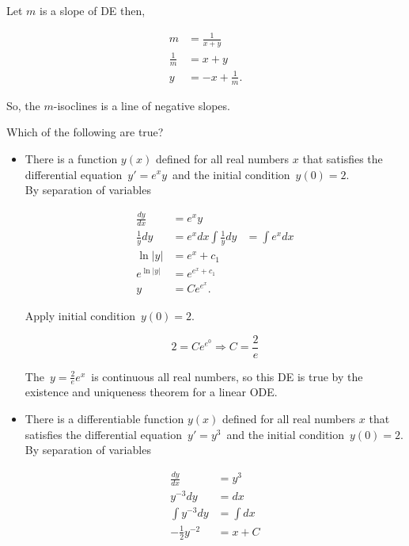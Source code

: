 Let $m$ is a slope of DE then,

\begin{align*}
  m &= \frac{1}{x + y} \\
  \frac{1}{m} &= x + y \\
  y &= -x + \frac{1}{m}. 
\end{align*}

So, the $m$-isoclines is a line of negative slopes.

\begin{problem}
  Which of the following are true? 
\end{problem}

\begin{itemize}
\item There is a function $y(x)$ defined for all real numbers $x$ that
  satisfies the differential equation $\, y' = e^xy \,$
  and the initial condition $\, y(0)=2$. \\

  By separation of variables

  \begin{align*}
    \frac{dy}{dx} &= e^x y \\
    \frac{1}{y} dy &= e^x dx 
    \int \frac{1}{y} dy &= \int e^x dx \\
    \ln |y| &=  e^x + c_1  \\
    e^{\ln |y|} &=  e^{e^x + c_1}  \\
    y &= Ce^{e^x}. 
  \end{align*}

  Apply initial condition $\, y(0)=2$.

  \begin{equation*}
    2 = Ce^{e^0} \Rightarrow C = \frac{2}{e}
  \end{equation*}

  The $\, y = \frac{2}{e} e^x \,$ is continuous all real numbers, so
  this DE is true by the existence and uniqueness theorem for a linear ODE.

\item There is a differentiable function $y(x)$ defined for all real numbers $x$
  that satisfies the differential equation $\, y' = y^3 \,$
  and the initial condition $\, y(0) = 2$. \\

  By separation of variables

  \begin{align*}
    \frac{dy}{dx} &= y^3 \\
    y^{-3} dy &= dx \\
    \int y^{-3} dy &= \int dx \\
    - \frac{1}{2} y^{-2} &= x + C \\
  \end{align*}


\end{itemize}
